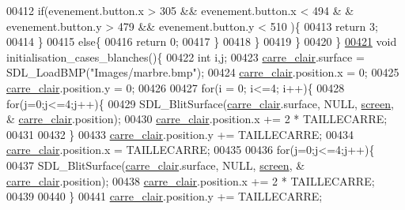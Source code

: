 \begin{DoxyCode}
00412                         \textcolor{keywordflow}{if}(evenement.button.x > 305 && evenement.button.x < 494 &
      & evenement.button.y > 479 && evenement.button.y < 510 )\{
00413                                 \textcolor{keywordflow}{return} 3;
00414                         \}
00415                         \textcolor{keywordflow}{else}\{
00416                                 \textcolor{keywordflow}{return} 0;
00417                         \}
00418                 \}
00419         \}
00420 \}
\hypertarget{fonction_interface_8c_source_l00421}{}\hyperlink{fonction_interface_8h_a757ae0e029a9f8857391b1fb5939d54a}{00421} \textcolor{keywordtype}{void} initialisation\_cases\_blanches()\{
00422         \textcolor{keywordtype}{int} i,j;
00423         \hyperlink{fonction_interface_8h_aa6a56f4dc2396c5f9de42147f569c367}{carre_clair}.surface = SDL\_LoadBMP(\textcolor{stringliteral}{"Images/marbre.bmp"});
00424         \hyperlink{fonction_interface_8h_aa6a56f4dc2396c5f9de42147f569c367}{carre_clair}.position.x = 0;
00425         \hyperlink{fonction_interface_8h_aa6a56f4dc2396c5f9de42147f569c367}{carre_clair}.position.y = 0;
00426 
00427         \textcolor{keywordflow}{for}(i = 0; i<=4; i++)\{
00428                 \textcolor{keywordflow}{for}(j=0;j<=4;j++)\{
00429                         SDL\_BlitSurface(\hyperlink{fonction_interface_8h_aa6a56f4dc2396c5f9de42147f569c367}{carre_clair}.surface, NULL, \hyperlink{fonction_interface_8h_a78fa3957d73de49cb81d047857504218}{screen}, &
      \hyperlink{fonction_interface_8h_aa6a56f4dc2396c5f9de42147f569c367}{carre_clair}.position);
00430                         \hyperlink{fonction_interface_8h_aa6a56f4dc2396c5f9de42147f569c367}{carre_clair}.position.x += 2 * TAILLECARRE;
00431 
00432                 \}
00433                 \hyperlink{fonction_interface_8h_aa6a56f4dc2396c5f9de42147f569c367}{carre_clair}.position.y += TAILLECARRE;
00434                 \hyperlink{fonction_interface_8h_aa6a56f4dc2396c5f9de42147f569c367}{carre_clair}.position.x = TAILLECARRE;
00435 
00436                 \textcolor{keywordflow}{for}(j=0;j<=4;j++)\{
00437                         SDL\_BlitSurface(\hyperlink{fonction_interface_8h_aa6a56f4dc2396c5f9de42147f569c367}{carre_clair}.surface, NULL, \hyperlink{fonction_interface_8h_a78fa3957d73de49cb81d047857504218}{screen}, &
      \hyperlink{fonction_interface_8h_aa6a56f4dc2396c5f9de42147f569c367}{carre_clair}.position);
00438                         \hyperlink{fonction_interface_8h_aa6a56f4dc2396c5f9de42147f569c367}{carre_clair}.position.x += 2 * TAILLECARRE;
00439 
00440                 \}
00441                 \hyperlink{fonction_interface_8h_aa6a56f4dc2396c5f9de42147f569c367}{carre_clair}.position.y += TAILLECARRE;

\end{DoxyCode}
